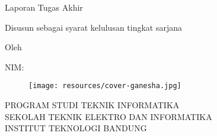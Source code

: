 \clearpage
\pagestyle{empty}

\begin{center}
\smallskip

    \large \bfseries \MakeUppercase{\thetitle}
    \vfill

    \large Laporan Tugas Akhir
    \vfill

    \normalsize Disusun sebagai syarat kelulusan tingkat sarjana
    \vfill

    \normalsize Oleh

    \large \theauthor

    \large NIM: \thestudentnumber

    \vfill
    \begin{figure}[h]
        \centering
      	\texttt{[image: resources/cover-ganesha.jpg]}
    \end{figure}
    \vfill

    \large
    \uppercase{
        Program Studi Teknik Informatika \\
        Sekolah Teknik Elektro dan Informatika \\
        Institut Teknologi Bandung \\
        \thedatemy
    }

\end{center}

\clearpage
